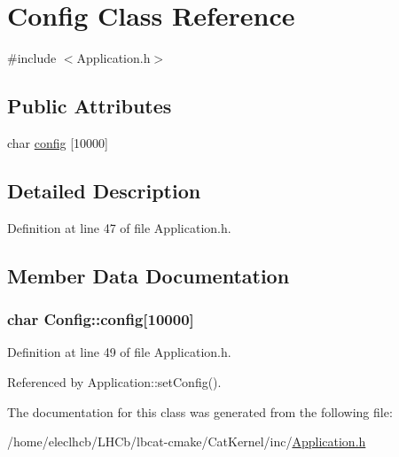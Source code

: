 \hypertarget{classConfig}{
\section{Config Class Reference}
\label{classConfig}
}


{\ttfamily \#include $<$Application.h$>$}\subsection*{Public Attributes}
\begin{DoxyCompactItemize}
\item 
char \hyperlink{classConfig_a4f977190294b342f444cacd04f0e909b}{config} \mbox{[}10000\mbox{]}
\end{DoxyCompactItemize}


\subsection{Detailed Description}


Definition at line 47 of file Application.h.

\subsection{Member Data Documentation}
\hypertarget{classConfig_a4f977190294b342f444cacd04f0e909b}{
\subsubsection[{config}]{\setlength{\rightskip}{0pt plus 5cm}char {\bf Config::config}\mbox{[}10000\mbox{]}}}
\label{classConfig_a4f977190294b342f444cacd04f0e909b}


Definition at line 49 of file Application.h.

Referenced by Application::setConfig().

The documentation for this class was generated from the following file:\begin{DoxyCompactItemize}
\item 
/home/eleclhcb/LHCb/lbcat-\/cmake/CatKernel/inc/\hyperlink{Application_8h}{Application.h}\end{DoxyCompactItemize}
